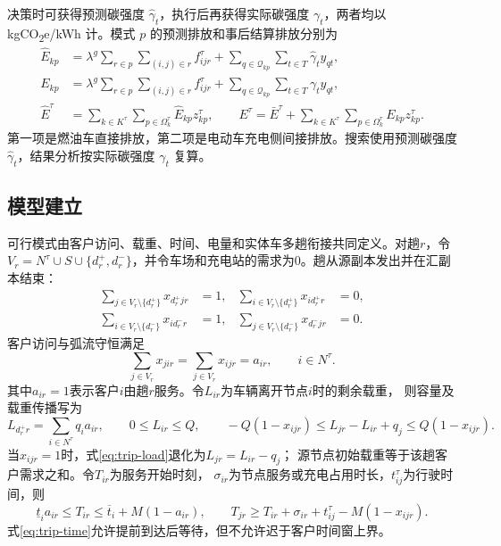 \documentclass{setp-new}
\begin{document}
决策时可获得预测碳强度 $\widehat\gamma_t$，执行后再获得实际碳强度 $\gamma_t$，两者均以 kgCO\textsubscript{2}e/kWh 计。模式 $p$ 的预测排放和事后结算排放分别为
\begin{equation}
\begin{aligned}
\widehat E_{kp}&=\lambda^g\sum_{r\in p}\sum_{(i,j)\in r}f_{ijr}^{\tau}
+\sum_{q\in\mathcal Q_{kp}}\sum_{t\in T}\widehat\gamma_ty_{qt},\\
E_{kp}&=\lambda^g\sum_{r\in p}\sum_{(i,j)\in r}f_{ijr}^{\tau}
+\sum_{q\in\mathcal Q_{kp}}\sum_{t\in T}\gamma_ty_{qt},\\
\widehat E^\tau&=\sum_{k\in K^\tau}\sum_{p\in\Omega_k^\tau}\widehat E_{kp}z_{kp}^\tau,
\qquad
E^\tau=\bar E^\tau+\sum_{k\in K^\tau}\sum_{p\in\Omega_k^\tau}E_{kp}z_{kp}^\tau .
\end{aligned}
\label{eq:carbon}
\end{equation}
第一项是燃油车直接排放，第二项是电动车充电侧间接排放。搜索使用预测碳强度 $\widehat\gamma_t$，结果分析按实际碳强度 $\gamma_t$ 复算。

\subsection{模型建立}

可行模式由客户访问、载重、时间、电量和实体车多趟衔接共同定义。对趟$r$，令
$V_r=N^\tau\cup S\cup\{d_r^+,d_r^-\}$，并令车场和充电站的需求为0。趟从源副本发出并在汇副本结束：
\begin{equation}
\begin{aligned}
\sum_{j\in V_r\setminus\{d_r^+\}}x_{d_r^+jr}&=1,&
\sum_{i\in V_r\setminus\{d_r^+\}}x_{id_r^+r}&=0,\\
\sum_{i\in V_r\setminus\{d_r^-\}}x_{id_r^-r}&=1,&
\sum_{j\in V_r\setminus\{d_r^-\}}x_{d_r^-jr}&=0.
\end{aligned}
\label{eq:trip-depot-flow}
\end{equation}
客户访问与弧流守恒满足
\begin{equation}
\sum_{j\in V_r}x_{jir}=\sum_{j\in V_r}x_{ijr}=a_{ir},\qquad
i\in N^\tau .
\label{eq:trip-flow-balance}
\end{equation}
其中$a_{ir}=1$表示客户$i$由趟$r$服务。令$L_{ir}$为车辆离开节点$i$时的剩余载重，
则容量及载重传播写为
\begin{equation}
L_{d_r^+r}=\sum_{i\in N^\tau}q_i a_{ir},\qquad
0\le L_{ir}\le Q,\qquad
-Q(1-x_{ijr})\le L_{jr}-L_{ir}+q_j\le Q(1-x_{ijr}).
\label{eq:trip-load}
\end{equation}
当$x_{ijr}=1$时，式\eqref{eq:trip-load}退化为$L_{jr}=L_{ir}-q_j$；
源节点初始载重等于该趟客户需求之和。令$T_{ir}$为服务开始时刻，
$\sigma_{ir}$为节点服务或充电占用时长，$t_{ij}^\tau$为行驶时间，则
\begin{equation}
\underline t_i a_{ir}\le T_{ir}\le \overline t_i+M(1-a_{ir}),\qquad
T_{jr}\ge T_{ir}+\sigma_{ir}+t_{ij}^\tau-M(1-x_{ijr}).
\label{eq:trip-time}
\end{equation}
式\eqref{eq:trip-time}允许提前到达后等待，但不允许迟于客户时间窗上界。
\end{document}
